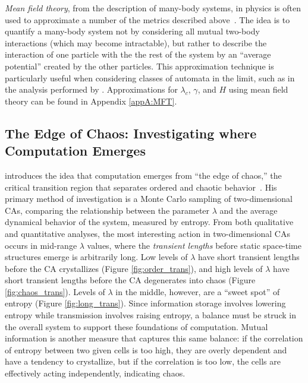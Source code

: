 \documentclass[a4paper,11pt]{article}
\begin{document}
\medskip

\textit{Mean field theory}, from the description of many-body systems, in physics is often used to approximate a number of the metrics described above~\cite{li90b,wo90}. The idea is to quantify a many-body system not by considering all mutual two-body interactions (which may become intractable), but rather to describe the interaction of one particle with the the rest of the system by an ``average potential'' created by the other particles. This approximation technique is particularly useful when considering classes of automata in the limit, such as in the analysis performed by \citeauthor{wo90}. Approximations for $\lambda_c$, $\gamma$, and $H$ using mean field theory can be found in Appendix \ref{appA:MFT}.





\subsection{The Edge of Chaos: Investigating where Computation Emerges}
\label{subsec:edge_chaos}
\citeauthor{la90} introduces the idea that computation emerges from ``the edge of chaos,'' the critical transition region that separates ordered and chaotic behavior~\cite{la90}. His primary method of investigation is a Monte Carlo sampling of two-dimensional CAs, comparing the relationship between the parameter $\lambda$ and the average dynamical behavior of the system, measured by entropy. From both qualitative and quantitative analyses, the most interesting action in two-dimensional CAs occurs in mid-range $\lambda$ values, where the \textit{transient lengths} before static space-time structures emerge is arbitrarily long. Low levels of $\lambda$ have short transient lengths before the CA crystallizes (Figure \ref{fig:order_trans}), and high levels of $\lambda$ have short transient lengths before the CA degenerates into chaos (Figure \ref{fig:chaos_trans}). Levels of $\lambda$ in the middle, however, are a ``sweet spot'' of entropy (Figure \ref{fig:long_trans}). Since information storage involves lowering entropy while transmission involves raising entropy, a balance must be struck in the overall system to support these foundations of computation. Mutual information is another measure that captures this same balance: if the correlation of entropy between two given cells is too high, they are overly dependent and have a tendency to crystallize, but if the correlation is too low, the cells are effectively acting independently, indicating chaos. 
\end{document}
